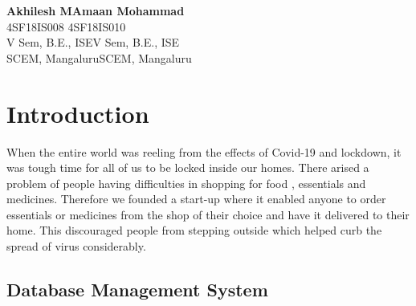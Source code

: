 \documentclass[12pt,a4paper]{report}
\begin{document}
\begin{flushright}
\textbf{Akhilesh M}\hspace{6.7cm}\textbf{Amaan Mohammad}\\
\hspace{0.2in}4SF18IS008 \hspace{3.38in}4SF18IS010\\
V Sem, B.E., ISE\hspace{7.7cm}V Sem, B.E., ISE\\
SCEM, Mangaluru\hspace{7.5cm}SCEM, Mangaluru\\
\end{flushright}

\renewcommand{\contentsname}{Table of Contents}
\tableofcontents
{}
\listoffigures
{}
\newpage

\pagestyle{fancy}
\fancyhf{}
\renewcommand{\headrulewidth}{0.5pt}
\renewcommand{\footrulewidth}{0.5pt}

\chapter{Introduction}

When the entire world was reeling from the effects of Covid-19 and lockdown, it was tough time for all of us to be locked inside our homes. There arised a problem of people having difficulties in shopping for food , essentials and medicines. Therefore we founded a start-up where it enabled anyone to order essentials or medicines from the shop of their choice and have it delivered to their home. This discouraged people from stepping outside which helped curb the spread of virus considerably. 
\section{Database Management System }
\end{document}
